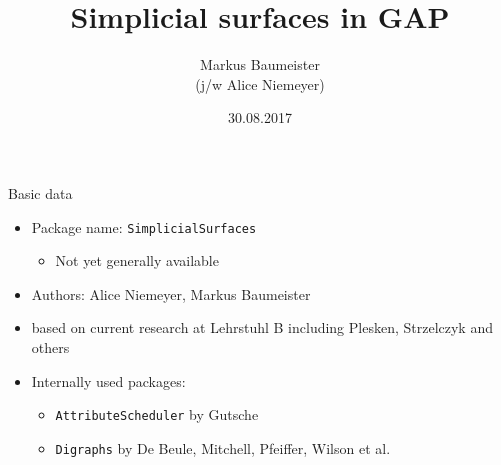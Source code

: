 \documentclass[11pt, handout]{beamer}
\author[Baumeister]{Markus Baumeister\\ \vspace{1mm} \small{(j/w Alice Niemeyer)}}
\title{Simplicial surfaces in GAP}
\institute[Aachen]{Lehrstuhl B für Mathematik\\RWTH Aachen University}
\date{30.08.2017}
\begin{document}
\begin{frame}
\titlepage
\end{frame}

\begin{frame}{Basic data}
    \begin{itemize}
        \pause
        \item Package name: \texttt{SimplicialSurfaces}
            \begin{itemize}
                \pause
                \item Not yet generally available
            \end{itemize}
        \pause
        \item Authors: Alice Niemeyer, Markus Baumeister
        \pause
        \item based on current research at Lehrstuhl B including Plesken, Strzelczyk and others
        \pause
        \item Internally used packages:
            \begin{itemize}
                \pause
                \item \texttt{AttributeScheduler} by Gutsche
                \pause
                \item \texttt{Digraphs} by De Beule, Mitchell, Pfeiffer, Wilson et al.
            \end{itemize}
    \end{itemize}
\end{frame}
\end{document}
